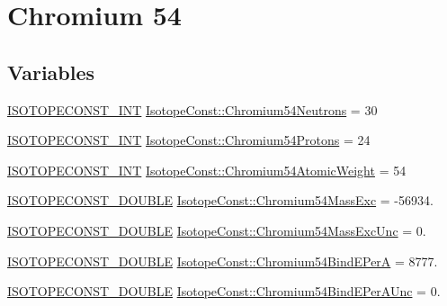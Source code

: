 \hypertarget{group___isotope_const-_chromium-_cr54}{}\section{Chromium 54}
\label{group___isotope_const-_chromium-_cr54}
\subsection*{Variables}
\begin{DoxyCompactItemize}
\item 
\mbox{\hyperlink{group___isotope_const-_macros_ga5f18360b3e99483a35c32d789e62621c}{I\+S\+O\+T\+O\+P\+E\+C\+O\+N\+S\+T\+\_\+\+I\+NT}} \mbox{\hyperlink{group___isotope_const-_chromium-_cr54_ga099713af6b366e7b7a0bfcb2ed739844}{Isotope\+Const\+::\+Chromium54\+Neutrons}} = 30
\item 
\mbox{\hyperlink{group___isotope_const-_macros_ga5f18360b3e99483a35c32d789e62621c}{I\+S\+O\+T\+O\+P\+E\+C\+O\+N\+S\+T\+\_\+\+I\+NT}} \mbox{\hyperlink{group___isotope_const-_chromium-_cr54_gaa9388dec3d4f67718af9bd58d78c340d}{Isotope\+Const\+::\+Chromium54\+Protons}} = 24
\item 
\mbox{\hyperlink{group___isotope_const-_macros_ga5f18360b3e99483a35c32d789e62621c}{I\+S\+O\+T\+O\+P\+E\+C\+O\+N\+S\+T\+\_\+\+I\+NT}} \mbox{\hyperlink{group___isotope_const-_chromium-_cr54_ga0bc122cbe23e1a05ae4f770c1b1b24de}{Isotope\+Const\+::\+Chromium54\+Atomic\+Weight}} = 54
\item 
\mbox{\hyperlink{group___isotope_const-_macros_ga8f45a7272ce02c0b4c65c44636ed719a}{I\+S\+O\+T\+O\+P\+E\+C\+O\+N\+S\+T\+\_\+\+D\+O\+U\+B\+LE}} \mbox{\hyperlink{group___isotope_const-_chromium-_cr54_gaa6339b158fad84355a8668620f8dca90}{Isotope\+Const\+::\+Chromium54\+Mass\+Exc}} = -\/56934.
\item 
\mbox{\hyperlink{group___isotope_const-_macros_ga8f45a7272ce02c0b4c65c44636ed719a}{I\+S\+O\+T\+O\+P\+E\+C\+O\+N\+S\+T\+\_\+\+D\+O\+U\+B\+LE}} \mbox{\hyperlink{group___isotope_const-_chromium-_cr54_gac273ba2ebed61747abb199a95aaa24c3}{Isotope\+Const\+::\+Chromium54\+Mass\+Exc\+Unc}} = 0.
\item 
\mbox{\hyperlink{group___isotope_const-_macros_ga8f45a7272ce02c0b4c65c44636ed719a}{I\+S\+O\+T\+O\+P\+E\+C\+O\+N\+S\+T\+\_\+\+D\+O\+U\+B\+LE}} \mbox{\hyperlink{group___isotope_const-_chromium-_cr54_ga68a34d9a758e04f40316913c52387df7}{Isotope\+Const\+::\+Chromium54\+Bind\+E\+PerA}} = 8777.
\item 
\mbox{\hyperlink{group___isotope_const-_macros_ga8f45a7272ce02c0b4c65c44636ed719a}{I\+S\+O\+T\+O\+P\+E\+C\+O\+N\+S\+T\+\_\+\+D\+O\+U\+B\+LE}} \mbox{\hyperlink{group___isotope_const-_chromium-_cr54_ga3a4b16fb8c7b84af8fccae0dd72aafb3}{Isotope\+Const\+::\+Chromium54\+Bind\+E\+Per\+A\+Unc}} = 0.

\end{DoxyCompactItemize}
